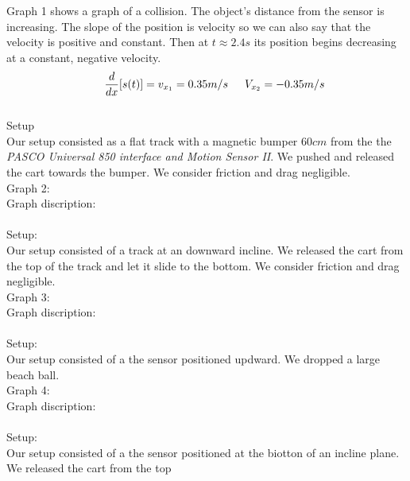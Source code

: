 \documentclass[12pt, letterpaper]{article}
\begin{document}
  Graph 1 shows a graph of a collision. The object's distance from the sensor 
  is increasing. The slope of the position is velocity so we can also say 
  that the velocity is positive and constant. Then at $t\approx2.4s$ its position
  begins decreasing at a constant, negative velocity.\\ 
  \begin{equation} 
    \indent{} \frac{d}{dx}[s(t)] =  v_{x_1} = 0.35m/s
    \indent{}V_{x_2}= -0.35m/s
  \end{equation}\\
  \large{Setup}\\
  Our setup consisted as a flat track with a magnetic bumper $60cm$ from the
  the \emph{PASCO Universal 850 interface and Motion Sensor II}. We pushed and released the cart towards the bumper. 
  We consider friction and drag negligible.\\

  \large{Graph 2:}\\
  \large{Graph discription:}\\
  \\
  \large{Setup:}\\
  Our setup consisted of a track at an downward incline. We released the cart from the 
  top of the track and let it slide to the bottom. We consider friction and drag negligible.\\

  \large{Graph 3:}\\
  \large{Graph discription:}\\
  \\
  \large{Setup:}\\
  Our setup consisted of a the sensor positioned updward. We dropped a large beach ball.\\

  \large{Graph 4:}\\
  \large{Graph discription:}\\
  \\
  \large{Setup:}\\
  Our setup consisted of a the sensor positioned at the biotton of an incline plane. We released the cart from the top 
\end{document}

